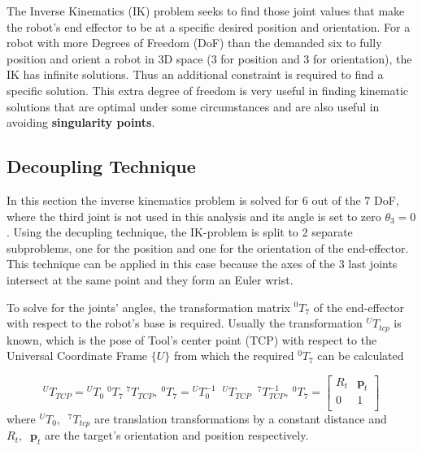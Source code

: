 The Inverse Kinematics (IK) problem seeks to find those joint values that make the robot's end effector to be at a specific desired position and orientation. For a robot with more Degrees of Freedom (DoF) than the demanded six to fully position and orient a robot in 3D space (3 for position and 3 for orientation), the IK has infinite solutions. Thus an additional constraint is required to find a specific solution. This extra degree of freedom is very useful in finding kinematic solutions that are optimal under some circumstances and are also useful in avoiding \textbf{singularity points}.

\subsection{Decoupling Technique}

In this section the inverse kinematics problem is solved for 6 out of the 7 DoF, where the third joint is not used in this analysis and its angle is set to zero $θ_3 = 0$ . Using the decupling technique, the IK-problem is split to 2 separate subproblems, one for the position and one for the orientation of the end-effector. This technique can be applied in this case because the axes of the 3 last joints intersect at the same point and they form an Euler wrist. 

To solve for the joints' angles, the transformation matrix $^0T_7$ of the end-effector with respect to the robot's base is required. Usually the transformation ${}^UT_{tcp}$ is known, which is the pose of Tool's center point (TCP) with respect to the Universal Coordinate Frame $\lbrace U \rbrace$ from which the required $^0T_7$ can be calculated

\begin{equation}
{}^UT_{TCP} = {}^UT_0  \;  {}^0T_7  \;   {}^7T_{TCP}
,
~
{}^0T_7 = {}^UT_0^{-1}  \;\;  {}^UT_{TCP}  \;\;  {}^7T_{TCP}^{-1}
,
~
{}^0T_7 = \begin{bmatrix}
R_t & \mathbf{p}_t \\
0 & 1 \\
\end{bmatrix}
\end{equation}
%
where ${}^UT_0,  \;\;   {}^7T_{tcp}$ are translation transformations by a constant distance and $R_t,  \;\; \mathbf{p}_t$ are the target's orientation 
and position respectively.


